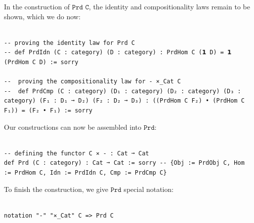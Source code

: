 \documentclass{book}
\newcounter{lcounter}
\begin{document}
In the construction of $\texttt{Prd C}$, the identity and compositionality laws remain to be shown, which we do now:\\

\begin{center}
\begin{tcolorbox}[width=5in,colback={white},title={\begin{center}\texttt{Lean \thelcounter} \addtocounter{lcounter}{1}  \end{center}},colbacktitle=Blue,coltitle=black]
\begin{verbatim}

-- proving the identity law for Prd C
-- def PrdIdn (C : category) (D : category) : PrdHom C (𝟭 D) = 𝟭 (PrdHom C D) := sorry

--  proving the compositionality law for - ×_Cat C 
--  def PrdCmp (C : category) (D₁ : category) (D₂ : category) (D₃ : category) (F₁ : D₁ ➞ D₂) (F₂ : D₂ ➞ D₃) : ((PrdHom C F₂) • (PrdHom C F₁)) = (F₂ • F₁) := sorry

\end{verbatim}%
\end{tcolorbox}
\end{center}

Our constructions can now be assembled into $\texttt{Prd}$:

\begin{center}
\begin{tcolorbox}[width=5in,colback={white},title={\begin{center}\texttt{Lean \thelcounter} \addtocounter{lcounter}{1}  \end{center}},colbacktitle=Blue,coltitle=black]
\begin{verbatim}

-- defining the functor C ⨯ - : Cat ➞ Cat
def Prd (C : category) : Cat ➞ Cat := sorry -- {Obj := PrdObj C, Hom := PrdHom C, Idn := PrdIdn C, Cmp := PrdCmp C}

\end{verbatim}%
\end{tcolorbox}
\end{center}

To finish the construction, we give $\texttt{Prd}$ special notation:

\begin{center}
\begin{tcolorbox}[width=5in,colback={white},title={\begin{center}\texttt{Lean \thelcounter} \addtocounter{lcounter}{1}  \end{center}},colbacktitle=Blue,coltitle=black]
\begin{verbatim}

notation "-" "⨯_Cat" C => Prd C

\end{verbatim}%
\end{tcolorbox}
\end{center}
\end{document}
